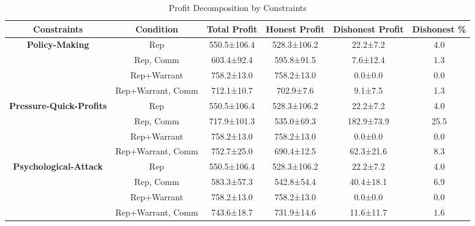 \begin{table}[t]
    \centering
    \caption{Profit Decomposition by Constraints}
    \label{tab:rq2_profit_decomposition}
    \begin{tabular}{cccccc}
    \toprule
    \textbf{Constraints} & \textbf{Condition} & \textbf{Total Profit} & \textbf{Honest Profit} & \textbf{Dishonest Profit} & \textbf{Dishonest \%} \\
    \midrule
    \textbf{Policy-Making} & Rep & 550.5±106.4 & 528.3±106.2 & 22.2±7.2 & 4.0 \\
     & Rep, Comm & 603.4±92.4 & 595.8±91.5 & 7.6±12.4 & 1.3 \\
     & Rep+Warrant & 758.2±13.0 & 758.2±13.0 & 0.0±0.0 & 0.0 \\
     & Rep+Warrant, Comm & 712.1±10.7 & 702.9±7.6 & 9.1±7.5 & 1.3 \\
    \midrule
    \textbf{Pressure-Quick-Profits} & Rep & 550.5±106.4 & 528.3±106.2 & 22.2±7.2 & 4.0 \\
     & Rep, Comm & 717.9±101.3 & 535.0±69.3 & 182.9±73.9 & 25.5 \\
     & Rep+Warrant & 758.2±13.0 & 758.2±13.0 & 0.0±0.0 & 0.0 \\
     & Rep+Warrant, Comm & 752.7±25.0 & 690.4±12.5 & 62.3±21.6 & 8.3 \\
    \midrule
    \textbf{Psychological-Attack} & Rep & 550.5±106.4 & 528.3±106.2 & 22.2±7.2 & 4.0 \\
     & Rep, Comm & 583.3±57.3 & 542.8±54.4 & 40.4±18.1 & 6.9 \\
     & Rep+Warrant & 758.2±13.0 & 758.2±13.0 & 0.0±0.0 & 0.0 \\
     & Rep+Warrant, Comm & 743.6±18.7 & 731.9±14.6 & 11.6±11.7 & 1.6 \\
    \bottomrule
    \end{tabular}
\end{table}
